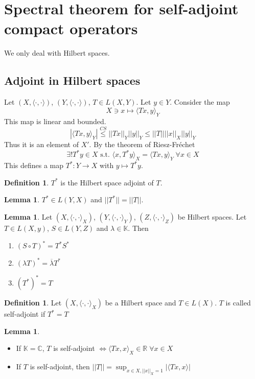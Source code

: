 \documentclass[a4paper, 12pt]{article}
\theoremstyle{plain}
\theoremstyle{definition}
\newtheorem{definition}[theorem]{Definition} %
\theoremstyle{lemma}
\newtheorem{lemma}[theorem]{Lemma}
\theoremstyle{remark}
\theoremstyle{corollary}
\theoremstyle{example}
\begin{document}
	\section{Spectral theorem for self-adjoint compact operators}
	We only deal with Hilbert spaces.
	\subsection{Adjoint in Hilbert spaces}
	Let $(X,\langle\cdot, \cdot \rangle)$, $(Y,\langle\cdot, \cdot \rangle)$, $T \in L(X,Y)$. Let $y \in Y$. Consider the map \[X\ni x \mapsto \langle Tx,y\rangle_Y\] 
	This map is linear and bounded.\[\left|\langle Tx,y\rangle_Y\right| \overset{CS}{\leq} ||Tx||_Y||y||_Y \leq ||T||||x||_X||y||_Y\] Thus it is an element of $X'$. By the theorem of Riesz-Fréchet \[\exists! T^*y \in X \text{ s.t. } \langle x,T^*y\rangle_X= \langle Tx,y\rangle_Y \; \forall x \in X\]
	This defines a map $T^*: Y \to X$ with $y \mapsto T^*y$.
	\begin{definition}
		$T^*$ is the Hilbert space adjoint of $T$. 
	\end{definition}
	\begin{lemma}
		$T^* \in L(Y,X)$ and $||T^*|| = ||T||$. 
	\end{lemma}
	\begin{lemma}
		Let $(X,\langle\cdot ,\cdot \rangle_X)$, $(Y, \langle \cdot , \cdot \rangle_Y)$, $(Z,\langle \cdot, \cdot \rangle_Z)$ be Hilbert spaces. Let $T \in L(X,y)$, $S \in L(Y,Z)$ and $\lambda \in \mathbb{K}$. Then \begin{enumerate}
			\item $(S\circ T)^* = T^*S^*$
			\item $(\lambda T)^* = \overline{\lambda}T^*$
			\item $(T^*)^* = T$ 
		\end{enumerate}
	\end{lemma}
	\begin{definition}
		Let $(X,\langle\cdot ,\cdot \rangle_X)$ be a Hilbert space  and $T\in L(X)$. $T$ is called self-adjoint if $T^* = T$
	\end{definition}
	\begin{lemma}
		\begin{itemize}
			\item If $\mathbb{K} = \mathbb{C}$, $T$ is self-adjoint $\Leftrightarrow \langle Tx,x\rangle_X \in \mathbb{R} \; \forall x \in X$
			\item If $T$ is self-adjoint, then $||T|| = \sup_{x \in X, ||x||_X=1} \left|\langle Tx, x\rangle\right|$ 
		\end{itemize}
	\end{lemma}
\end{document}
